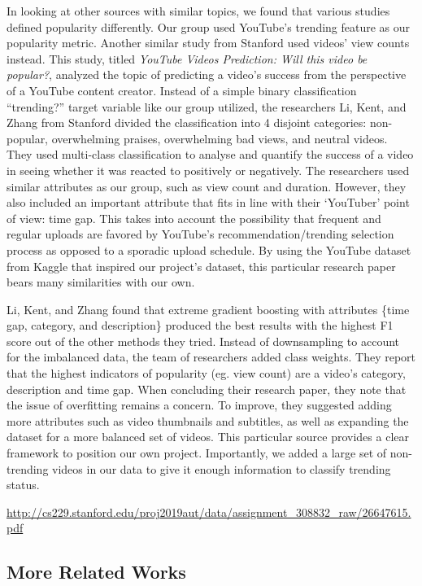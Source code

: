 \documentclass{article}
\begin{document}
\quad In looking at other sources with similar topics, we found that various studies defined popularity differently. Our group used YouTube’s trending feature as our popularity metric. Another similar study from Stanford used videos’ view counts instead. This study, titled \textit{YouTube Videos Prediction: Will this video be popular?}, analyzed the topic of predicting a video’s success from the perspective of a YouTube content creator. Instead of a simple binary classification “trending?” target variable like our group utilized, the researchers Li, Kent, and Zhang from Stanford divided the classification into 4 disjoint categories: non-popular, overwhelming praises, overwhelming bad views, and neutral videos. They used multi-class classification to analyse and quantify the success of a video in seeing whether it was reacted to positively or negatively. The researchers used similar attributes as our group, such as view count and duration. However, they also included an important attribute that fits in line with their ‘YouTuber’ point of view: time gap. This takes into account the possibility that frequent and regular uploads are favored by YouTube’s recommendation/trending selection process as opposed to a sporadic upload schedule. By using the YouTube dataset from Kaggle that inspired our project’s dataset, this particular research paper bears many similarities with our own. \par
Li, Kent, and Zhang found that extreme gradient boosting with attributes \{time gap, category, and description\} produced the best results with the highest F1 score out of the other methods they tried. Instead of downsampling to account for the imbalanced data, the team of researchers added class weights. They report that the highest indicators of popularity (eg. view count) are a video’s category, description and time gap. When concluding their research paper, they note that the issue of overfitting remains a concern. To improve, they suggested adding more attributes such as video thumbnails and subtitles, as well as expanding the dataset for a more balanced set of videos. This particular source provides a clear framework to position our own project. Importantly, we added a large set of non-trending videos in our data to give it enough information to classify trending status. \smallskip

\href{http://cs229.stanford.edu/proj2019aut/data/assignment_308832_raw/26647615.pdf}{http://cs229.stanford.edu/proj2019aut/data/assignment\_308832\_raw/26647615.pdf}

\subsection*{More Related Works}
\end{document}
